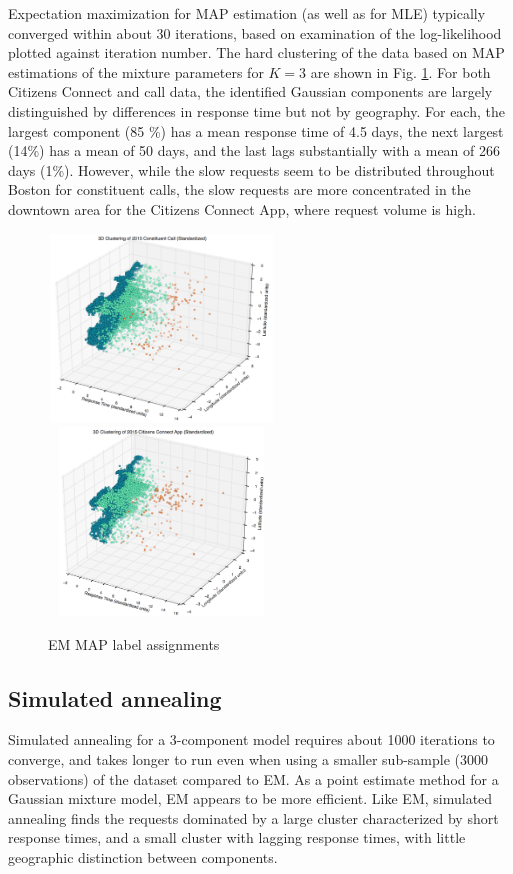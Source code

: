 \documentclass[twoside]{article}
\theoremstyle{theorem}
\theoremstyle{theorem}
\theoremstyle{theorem}
\theoremstyle{lemma}
\theoremstyle{definition}
\theoremstyle{example}
\begin{document}
Expectation maximization for MAP estimation (as well as for MLE) typically converged within about 30 iterations, based on examination of the log-likelihood plotted against iteration number. The hard clustering of the data based on MAP estimations of the mixture parameters for $K=3$ are shown in Fig. \ref{EMlabels}. For both Citizens Connect and call data, the identified Gaussian components are largely distinguished by differences in response time but not by geography. For each, the largest component (85 \%) has a mean response time of 4.5 days, the next largest (14\%) has a mean of 50 days, and the last lags substantially with a mean of 266 days (1\%). However, while the slow requests seem to be distributed throughout Boston for constituent calls, the slow requests are more concentrated in the downtown area for the Citizens Connect App, where request volume is high.
\begin{figure}[h!]
\begin{center}
\includegraphics[width=60mm, height=50mm]{3D_call}
\includegraphics[width=60mm, height=50mm]{3D_app}
\caption{EM MAP label assignments}
\label{EMlabels}
\end{center}
\end{figure}

\subsection{Simulated annealing}
Simulated annealing for a 3-component model requires about 1000 iterations to converge, and takes longer to run even when using a smaller sub-sample (3000 observations) of the dataset compared to EM. As a point estimate method for a Gaussian mixture model, EM appears to be more efficient. Like EM, simulated annealing finds the requests dominated by a large cluster characterized by short response times, and a small cluster with lagging response times, with little geographic distinction between components. 
\end{document}
